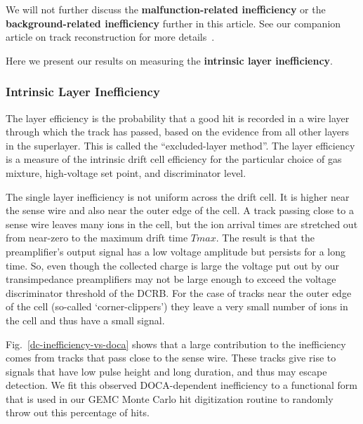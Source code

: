 We will not further discuss the {\bf malfunction-related inefficiency} or
the {\bf background-related inefficiency} further in this article.  See
our companion article on track reconstruction for more details~\cite{recon-nim}.

Here we present our results on measuring the {\bf intrinsic layer inefficiency}.

\subsubsection{Intrinsic Layer Inefficiency}

The layer efficiency is the probability that a
good hit is recorded in a wire layer through which the track has passed, based on 
the evidence from all other layers in the superlayer.  This is called the 
``excluded-layer method''.  The layer efficiency is a measure of the intrinsic drift 
cell efficiency for the particular choice of gas mixture, high-voltage set point, and 
discriminator level.  


The single layer inefficiency is not uniform across the drift cell.  It is higher near the sense wire and also
near the outer edge of the cell.  A track passing close to a sense wire leaves many ions in the cell, but the
ion arrival times are stretched out from near-zero to the maximum drift time $Tmax$.  The result is that
the preamplifier's output signal has a low voltage amplitude but persists for a long time.  So, even though
the collected charge is large the voltage put out by our transimpedance preamplifiers may not be large
enough to exceed the voltage discriminator threshold of the DCRB. For the case of tracks near the outer
edge of the cell (so-called `corner-clippers') they leave a very small number of ions in the cell and
thus have a small signal.

Fig.~\ref{dc-inefficiency-vs-doca} shows that a large contribution to the inefficiency comes 
from tracks that pass close to the sense wire.  These tracks give rise to signals 
that have low pulse height and long duration, and thus may escape detection.
We fit this observed DOCA-dependent inefficiency to a functional form that is
used in our GEMC Monte Carlo hit digitization routine to randomly throw out
this percentage of hits.

